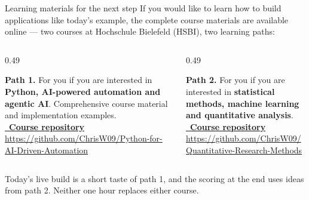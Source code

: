 \begin{frame}{Learning materials for the next step}
  {\small If you would like to learn how to build applications like today's example, the complete course
  materials are available online --- two courses at Hochschule Bielefeld (HSBI), two learning paths:}\par
  \vspace{3mm}
  \begin{columns}[T,onlytextwidth]
    \begin{column}{0.49\textwidth}
      \begin{labnote}
        \small \textbf{Path 1.} For you if you are interested in \textbf{Python, AI-powered automation and agentic AI}.
        Comprehensive course material and implementation examples.\\[2mm]
        \href{https://github.com/ChrisW09/Python-for-AI-Driven-Automation}{\color{accent}\faGithub\ \textbf{Course repository}}\\[0.5mm]
        {\scriptsize\url{https://github.com/ChrisW09/Python-for-AI-Driven-Automation}}
      \end{labnote}
    \end{column}
    \begin{column}{0.49\textwidth}
      \begin{readme}
        \small \textbf{Path 2.} For you if you are interested in \textbf{statistical methods, machine learning and
        quantitative analysis}.\\[2mm]
        \href{https://github.com/ChrisW09/Quantitative-Research-Methods}{\color{accent}\faGithub\ \textbf{Course repository}}\\[0.5mm]
        {\scriptsize\url{https://github.com/ChrisW09/Quantitative-Research-Methods}}
      \end{readme}
    \end{column}
  \end{columns}
  \vspace{2mm}
  {\footnotesize\color{black!60}Today's live build is a short taste of path 1, and the scoring at the end uses ideas from
  path 2. Neither one hour replaces either course.}
\end{frame}

